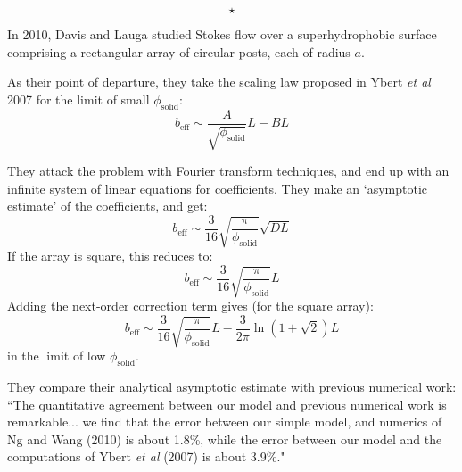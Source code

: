 \documentclass[a4paper]{report}
\newcommand{\beff}{\ensuremath{b_{\mathrm{eff}}}}
\newcommand{\phisol}{\ensuremath{\phi_{\mathrm{solid}}}}
\newcommand{\sep}{\begin{equation*} \star \end{equation*}}
\begin{document}
\sep

In 2010, Davis and Lauga \cite{DavisLauga2010} studied Stokes flow over a superhydrophobic surface comprising a rectangular array of circular posts, each of radius $a$.

\begin{center}
\end{center}

As their point of departure, they take the scaling law proposed in Ybert \emph{et al} 2007 for the limit of small $\phisol$:
\begin{equation*}
\beff \sim \frac{A}{\sqrt{\phisol}} L - BL
\end{equation*}

They attack the problem with Fourier transform techniques, and end up with an infinite system of linear equations for coefficients.  They make an `asymptotic estimate' of the coefficients, and get:
\begin{equation*}
\beff \sim \frac{3}{16} \sqrt{ \frac{\pi}{\phisol}} \sqrt{DL}
\end{equation*}
If the array is square, this reduces to:
\begin{equation*}
\beff \sim \frac{3}{16} \sqrt{ \frac{\pi}{\phisol}} L
\end{equation*}
Adding the next-order correction term gives (for the square array):
\begin{equation*}
\beff \sim \frac{3}{16} \sqrt{ \frac{\pi}{\phisol}} L - \frac{3}{2\pi} \ln(1 + \sqrt{2})L
\end{equation*}
in the limit of low $\phisol$.

They compare their analytical asymptotic estimate with previous numerical work: ``The quantitative agreement between our model and previous numerical work is remarkable... we find that the error between our simple model, and numerics of Ng and Wang (2010) \cite{NgWang2010} is about 1.8\%, while the error between our model and the computations of Ybert \emph{et al} (2007) \cite{Ybert2007} is about 3.9\%."
\end{document}
